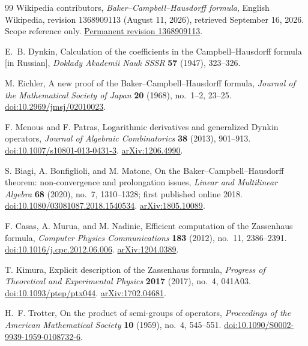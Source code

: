 \documentclass[11pt]{article}
\theoremstyle{definition}
\theoremstyle{remark}
\numberwithin{equation}{section}
\begin{document}
\begin{thebibliography}{99}
Wikipedia contributors, \emph{Baker--Campbell--Hausdorff formula}, English Wikipedia, revision 1368909113 (August 11, 2026), retrieved September 16, 2026. Scope reference only.
\href{https://en.wikipedia.org/w/index.php?oldid=1368909113}{Permanent revision 1368909113}.

E.~B. Dynkin, Calculation of the coefficients in the Campbell--Hausdorff formula [in Russian], \emph{Doklady Akademii Nauk SSSR} \textbf{57} (1947), 323--326.

M. Eichler, A new proof of the Baker--Campbell--Hausdorff formula, \emph{Journal of the Mathematical Society of Japan} \textbf{20} (1968), no.~1--2, 23--25.
\href{https://doi.org/10.2969/jmsj/02010023}{doi:10.2969/jmsj/02010023}.

F. Menous and F. Patras, Logarithmic derivatives and generalized Dynkin operators, \emph{Journal of Algebraic Combinatorics} \textbf{38} (2013), 901--913.
\href{https://doi.org/10.1007/s10801-013-0431-3}{doi:10.1007/s10801-013-0431-3}.
\href{https://arxiv.org/abs/1206.4990}{arXiv:1206.4990}.

S. Biagi, A. Bonfiglioli, and M. Matone, On the Baker--Campbell--Hausdorff theorem: non-convergence and prolongation issues, \emph{Linear and Multilinear Algebra} \textbf{68} (2020), no.~7, 1310--1328; first published online 2018.
\href{https://doi.org/10.1080/03081087.2018.1540534}{doi:10.1080/03081087.2018.1540534}.
\href{https://arxiv.org/abs/1805.10089}{arXiv:1805.10089}.

F. Casas, A. Murua, and M. Nadinic, Efficient computation of the Zassenhaus formula, \emph{Computer Physics Communications} \textbf{183} (2012), no.~11, 2386--2391.
\href{https://doi.org/10.1016/j.cpc.2012.06.006}{doi:10.1016/j.cpc.2012.06.006}.
\href{https://arxiv.org/abs/1204.0389}{arXiv:1204.0389}.

T. Kimura, Explicit description of the Zassenhaus formula, \emph{Progress of Theoretical and Experimental Physics} \textbf{2017} (2017), no.~4, 041A03.
\href{https://doi.org/10.1093/ptep/ptx044}{doi:10.1093/ptep/ptx044}.
\href{https://arxiv.org/abs/1702.04681}{arXiv:1702.04681}.

H.~F. Trotter, On the product of semi-groups of operators, \emph{Proceedings of the American Mathematical Society} \textbf{10} (1959), no.~4, 545--551.
\href{https://doi.org/10.1090/S0002-9939-1959-0108732-6}{doi:10.1090/S0002-9939-1959-0108732-6}.


\end{thebibliography}
\end{document}
